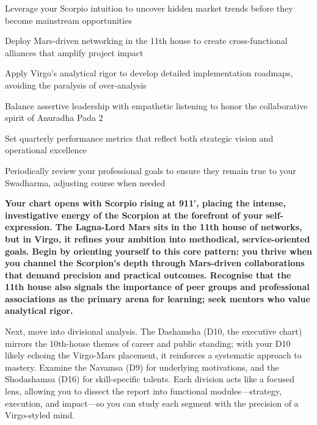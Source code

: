 \begin{diamondlist}
  \item {\fontsize{8.5}{12}\selectfont Leverage your Scorpio intuition to uncover hidden market trends before they become mainstream opportunities}
  \item {\fontsize{8.5}{12}\selectfont Deploy Mars-driven networking in the 11th house to create cross-functional alliances that amplify project impact}
  \item {\fontsize{8.5}{12}\selectfont Apply Virgo's analytical rigor to develop detailed implementation roadmaps, avoiding the paralysis of over-analysis}
  \item {\fontsize{8.5}{12}\selectfont Balance assertive leadership with empathetic listening to honor the collaborative spirit of Anuradha Pada 2}
  \item {\fontsize{8.5}{12}\selectfont Set quarterly performance metrics that reflect both strategic vision and operational excellence}
  \item {\fontsize{8.5}{12}\selectfont Periodically review your professional goals to ensure they remain true to your Swadharma, adjusting course when needed}
\end{diamondlist}


\label{topic4}

{\fontsize{9.5}{13.8}\selectfont\bfseries\color{DeepSlate} Your chart opens with Scorpio rising at 9\textdegree{}11′, placing the intense, investigative energy of the Scorpion at the forefront of your self-expression. The Lagna-Lord Mars sits in the 11th house of networks, but in Virgo, it refines your ambition into methodical, service-oriented goals. Begin by orienting yourself to this core pattern: you thrive when you channel the Scorpion's depth through Mars-driven collaborations that demand precision and practical outcomes. Recognise that the 11th house also signals the importance of peer groups and professional associations as the primary arena for learning; seek mentors who value analytical rigor.}\par\vspace{2mm}

{\fontsize{9}{13}\selectfont Next, move into divisional analysis. The Dashamsha (D10, the executive chart) mirrors the 10th-house themes of career and public standing; with your D10 likely echoing the Virgo-Mars placement, it reinforces a systematic approach to mastery. Examine the Navamsa (D9) for underlying motivations, and the Shodashamsa (D16) for skill-specific talents. Each division acts like a focused lens, allowing you to dissect the report into functional modules---strategy, execution, and impact---so you can study each segment with the precision of a Virgo-styled mind.}\par\vspace{1.8mm}

